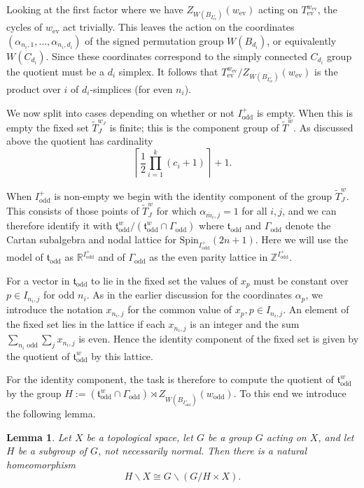 \documentclass[11pt,a4paper]{article}
\newtheorem{lemma}[theorem]{Lemma}
\def\Spin{\mathrm{Spin}}
\def\t{\mathfrak t}
\def\R{\mathbb{R}}
\def\Z{\mathbb{Z}}
\def\mbar{\overline{m}}
\def\mbar{\overline{m}}
\def\coveringtorus{\tilde{T}}
\def\ev{\mathrm{ev}}
\def\odd{\mathrm{odd}}
\begin{document}
Looking at the first factor where we have $Z_{W(B_{I^+_{\ev}})}(w_{\ev})$ acting on $T_\ev^{w_{\ev}}$, the cycles of $w_\ev$ act trivially.  This leaves the action on the coordinates $(\alpha_{n_i,1},\dots, \alpha_{n_i,d_i})$ of the signed permutation group $W(B_{d_i})$, or equivalently $W(C_{d_i})$.  Since these coordinates correspond to the simply connected $C_{d_i}$ group the quotient must be a $d_i$ simplex.  It follows that $T_\ev^{w_{\ev}}/Z_{W(B_{I^+_{\ev}})}(w_{\ev})$ is the product over $i$ of $d_i$-simplices (for even $n_i$).




\bigskip

We now split into cases depending on whether or not $I^+_{\odd}$ is empty. When this is empty the fixed set $\coveringtorus_J^{w_J}$ is finite; this is the component group of $\coveringtorus^w$.  As discussed above the quotient has cardinality
    \[
\left\lceil \frac 12 \prod_{i=1}^k (c_i+1)\right\rceil+1.
\]

When $I^+_{\odd}$ is non-empty we begin with the identity component of the group $\coveringtorus_J^w$. This consists of those points of $\coveringtorus_J^w$ for which $\alpha_{\mbar_i,j}=1$ for all $i,j$, and we can therefore identify it with $\t_{\odd}^w / (\t_{\odd}^w\cap \Gamma_{\odd})$  where $\t_{\odd}$ and $\Gamma_{\odd}$ denote the Cartan subalgebra and nodal lattice for $\Spin_{I^+_\odd}(2n+1)$.  Here we will use the model of $\t_{\odd}$ as $\R^{I^+_\odd}$ and of $\Gamma_{\odd}$ as the even parity lattice in $\Z^{I^+_\odd}$.

For a vector in $\t_\odd$ to lie in the fixed set the values of $x_p$ must be constant over $p\in I_{n_i,j}$ for odd $n_i$. As in the earlier discussion for the coordinates $\alpha_p$, we introduce the notation $x_{n_i,j}$ for the common value of $x_p, p\in I_{n_i,j}$. An element of the fixed set lies in the lattice if each $x_{n_i,j}$ is an integer and the sum $\sum\limits_{n_i \text{ odd}} \sum\limits_j x_{n_i,j}$ is even. Hence the identity component of the fixed set is given by the quotient of $\t_\odd^w$ by this lattice.

For the identity component, the task is therefore to compute the quotient of $\t_\odd^w$ by the group $H:=(\t_\odd^w\cap \Gamma_\odd)\rtimes Z_{W(B_{I^+_\odd})}(w_\odd)$. To this end we introduce the following lemma.

\begin{lemma}\label{lemma0}
    Let $X$ be a topological space, let $G$ be a group $G$ acting on $X$, and let $H$ be a subgroup of $G$, not necessarily normal. Then there is a natural homeomorphism
\[
H\backslash X \cong G \backslash(G/H \times X).
\]
\end{lemma}
\end{document}
